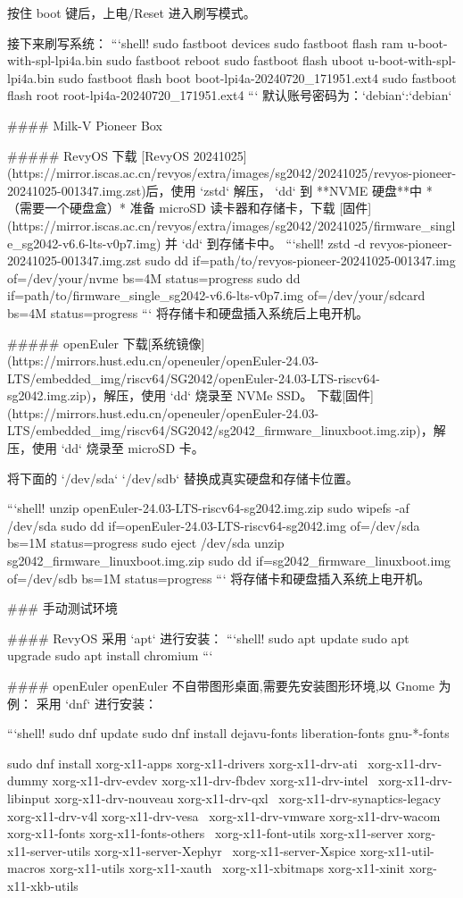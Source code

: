 \documentclass{article}
\begin{document}
\begin{markdown}
按住 boot 键后，上电/Reset 进入刷写模式。

接下来刷写系统：
```shell!
sudo fastboot devices
sudo fastboot flash ram u-boot-with-spl-lpi4a.bin 
sudo fastboot reboot
sudo fastboot flash uboot u-boot-with-spl-lpi4a.bin
sudo fastboot flash boot boot-lpi4a-20240720_171951.ext4
sudo fastboot flash root root-lpi4a-20240720_171951.ext4
```
默认账号密码为：`debian`:`debian`

#### Milk-V Pioneer Box

##### RevyOS
下载 [RevyOS 20241025](https://mirror.iscas.ac.cn/revyos/extra/images/sg2042/20241025/revyos-pioneer-20241025-001347.img.zst)后，使用 `zstd` 解压， `dd` 到 **NVME 硬盘**中 *（需要一个硬盘盒）*
准备 microSD 读卡器和存储卡，下载 [固件](https://mirror.iscas.ac.cn/revyos/extra/images/sg2042/20241025/firmware_single_sg2042-v6.6-lts-v0p7.img) 并 `dd` 到存储卡中。
```shell!
zstd -d revyos-pioneer-20241025-001347.img.zst
sudo dd if=path/to/revyos-pioneer-20241025-001347.img of=/dev/your/nvme bs=4M status=progress
sudo dd if=path/to/firmware_single_sg2042-v6.6-lts-v0p7.img of=/dev/your/sdcard bs=4M status=progress
```
将存储卡和硬盘插入系统后上电开机。

##### openEuler
下载[系统镜像](https://mirrors.hust.edu.cn/openeuler/openEuler-24.03-LTS/embedded_img/riscv64/SG2042/openEuler-24.03-LTS-riscv64-sg2042.img.zip)，解压，使用 `dd` 烧录至 NVMe SSD。
下载[固件](https://mirrors.hust.edu.cn/openeuler/openEuler-24.03-LTS/embedded_img/riscv64/SG2042/sg2042_firmware_linuxboot.img.zip)，解压，使用 `dd` 烧录至 microSD 卡。

将下面的 `/dev/sda` `/dev/sdb` 替换成真实硬盘和存储卡位置。

```shell!
unzip openEuler-24.03-LTS-riscv64-sg2042.img.zip
sudo wipefs -af /dev/sda
sudo dd if=openEuler-24.03-LTS-riscv64-sg2042.img of=/dev/sda bs=1M status=progress
sudo eject /dev/sda
unzip sg2042_firmware_linuxboot.img.zip
sudo dd if=sg2042_firmware_linuxboot.img of=/dev/sdb bs=1M status=progress
```
将存储卡和硬盘插入系统上电开机。

### 手动测试环境

#### RevyOS
采用 `apt` 进行安装：
```shell!
sudo apt update
sudo apt upgrade
sudo apt install chromium
```

#### openEuler
openEuler 不自带图形桌面,需要先安装图形环境,以 Gnome 为例：
采用 `dnf` 进行安装：

```shell!
sudo dnf update
sudo dnf install dejavu-fonts liberation-fonts gnu-*-fonts

sudo dnf install xorg-x11-apps xorg-x11-drivers xorg-x11-drv-ati \
 xorg-x11-drv-dummy xorg-x11-drv-evdev xorg-x11-drv-fbdev xorg-x11-drv-intel \
 xorg-x11-drv-libinput xorg-x11-drv-nouveau xorg-x11-drv-qxl \
 xorg-x11-drv-synaptics-legacy xorg-x11-drv-v4l xorg-x11-drv-vesa \
 xorg-x11-drv-vmware xorg-x11-drv-wacom xorg-x11-fonts xorg-x11-fonts-others \
 xorg-x11-font-utils xorg-x11-server xorg-x11-server-utils xorg-x11-server-Xephyr \
 xorg-x11-server-Xspice xorg-x11-util-macros xorg-x11-utils xorg-x11-xauth \
 xorg-x11-xbitmaps xorg-x11-xinit xorg-x11-xkb-utils


\end{markdown}
\end{document}
